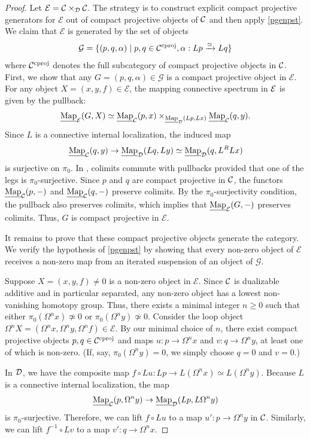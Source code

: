 \documentclass[a4paper,10pt, oneside]{amsart}
\begin{document}
\begin{proof}
	Let $\mathcal{E} = \mathcal{C} \times_{\mathcal{D}} \mathcal{C}$. The strategy is to construct explicit compact projective generators for $\mathcal{E}$ out of compact projective objects of $\mathcal{C}$ and then apply \cref{pgenpst}. We claim  that $\mathcal{E}$ is generated by the set of objects
	$$\mathcal{G} = \{ (p, q, \alpha) \mid p, q \in \mathcal{C}^{\mathrm{cproj}}, \alpha: Lp \xrightarrow{\simeq} Lq \}$$
	where $\mathcal{C}^{\mathrm{cproj}}$ denotes the full subcategory of compact projective objects in $\mathcal{C}$.
	First, we show that any $G = (p, q, \alpha) \in \mathcal{G}$ is a compact projective object in $\mathcal{E}$. For any object $X = (x, y, f) \in \mathcal{E}$, the mapping connective spectrum in $\mathcal{E}$ is given by the pullback:
	$$\underline{\operatorname{Map}}_{\mathcal{E}}(G, X) \simeq \underline{\operatorname{Map}}_\mathcal{C}(p, x) \times_{\underline{\operatorname{Map}}_\mathcal{D}(Lp, Lx)} \underline{\operatorname{Map}}_\mathcal{C}(q, y).$$
	Since $L$ is a connective internal localization, the induced map
	$$\underline{\operatorname{Map}}_\mathcal{C}(q, y) \to \underline{\operatorname{Map}}_\mathcal{D}(Lq, Ly) \simeq \underline{\operatorname{Map}}_\mathcal{D}(q, L^RLx)$$
	is surjective on $\pi_0$. In \spgeq, colimits commute with pullbacks provided that one of the legs is $\pi_0$-surjective. Since $p$ and $q$ are compact projective in $\mathcal{C}$, the functors $\underline{\operatorname{Map}}_\mathcal{C}(p, -)$ and $\underline{\operatorname{Map}}_\mathcal{C}(q, -)$ preserve colimits. By the $\pi_0$-surjectivity condition, the pullback also preserves colimits, which implies that $\underline{\operatorname{Map}}_{\mathcal{E}}(G, -)$ preserves colimits. Thus, $G$ is compact projective in $\mathcal{E}$.
	
It remains to prove that these compact projective objects generate the category. We verify the hypothesis of \cref{pgenpst} by showing that every non-zero object of $\mathcal{E}$ receives a non-zero map from an iterated suspension of an object of $\mathcal{G}$.

Suppose $X = (x, y, f)\neq0$ is a non-zero object in $\mathcal{E}$. Since $\mathcal{C}$ is dualizable additive and in particular separated, any non-zero object has a lowest non-vanishing homotopy group. Thus, there exists a minimal integer $n \geq 0$ such that either $\pi_0(\Omega^n x) \not\simeq 0$ or $\pi_0(\Omega^n y) \not\simeq 0$.
Consider the loop object $\Omega^n X = (\Omega^n x, \Omega^n y, \Omega^n f) \in \mathcal{E}$. 
By our minimal choice of $n$, there exist compact projective objects $p, q \in \mathcal{C}^{\mathrm{cproj}}$ and maps $u \colon p \to \Omega^n x$ and $v \colon q \to \Omega^n y$, at least one of which is non-zero.
 (If, say, $\pi_0(\Omega^n y) = 0$, we simply choose $q = 0$ and $v = 0$.)

In $\mathcal{D}$, we have the composite map $f \circ Lu: Lp \to L(\Omega^n x) \simeq L(\Omega^n y)$. Because $L$ is a connective internal localization, the map
\[
\underline{\operatorname{Map}}_\mathcal{C}(p, \Omega^n y) \to \underline{\operatorname{Map}}_\mathcal{D}(Lp, L\Omega^n y)
\]
is $\pi_0$-surjective. Therefore, we can lift $f \circ Lu$ to a map $u': p \to \Omega^n y$ in $\mathcal{C}$. Similarly, we can lift $f^{-1} \circ Lv$ to a map $v': q \to \Omega^n x$.


\end{proof}
\end{document}
